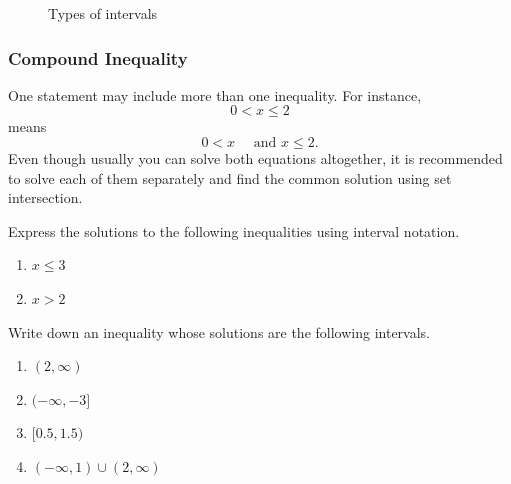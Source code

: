 \begin{frame}
\begin{figure}[h!]
\centering
{}
\caption{Types of intervals}
\end{figure}
\end{frame}


\begin{frame}
\frametitle{Compound Inequality}
One statement may include more than one inequality. For instance,
\[0 < x \leq 2\]
means
\[0 < x \quad \text{ and } x \leq 2.\]
Even though usually you can solve both equations altogether, it is recommended to solve each of them separately and find the common solution using set intersection.
\end{frame}

\begin{frame}
\begin{exercisebox}{}{}
Express the solutions to the following inequalities using interval notation.
\begin{enumerate}
\item $x \leq 3$
\item $x > 2$
\end{enumerate}
Write down an inequality whose solutions are the following intervals.
\begin{enumerate}
\item $(2, \infty)$
\item $(-\infty, -3]$
\item $[0.5, 1.5)$
\item $(-\infty, 1) \cup (2, \infty)$
\end{enumerate}

\end{exercisebox}
\end{frame}



